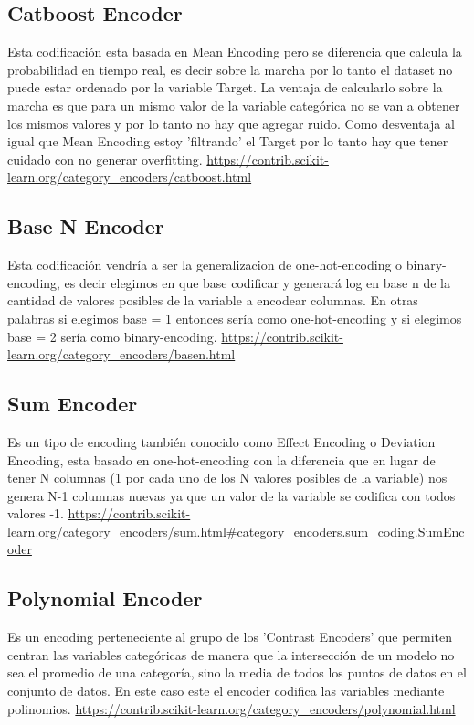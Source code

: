 \documentclass[12pt,a4paper]{article}
\begin{document}
\subsection{Catboost Encoder}
Esta codificación esta basada en Mean Encoding pero se diferencia que calcula la probabilidad en tiempo real, es decir sobre la marcha por lo tanto el dataset no puede estar ordenado por la variable Target. La ventaja de calcularlo sobre la marcha es que para un mismo valor de la variable categórica no se van a obtener los mismos valores y por lo tanto no hay que agregar ruido. Como desventaja al igual que Mean Encoding estoy 'filtrando' el Target por lo tanto hay que tener cuidado con no generar overfitting.
\url{https://contrib.scikit-learn.org/category_encoders/catboost.html}

\subsection{Base N Encoder}
Esta codificación vendría a ser la generalizacion de one-hot-encoding o binary-encoding, es decir elegimos en que base codificar y generará log en base n de la cantidad de valores posibles de la variable a encodear columnas. En otras palabras si elegimos base = 1 entonces sería como one-hot-encoding y si elegimos base = 2 sería como binary-encoding.
\url{https://contrib.scikit-learn.org/category_encoders/basen.html}

\subsection{Sum Encoder}
Es un tipo de encoding también conocido como Effect Encoding o Deviation Encoding, esta basado en one-hot-encoding con la diferencia que en lugar de tener N columnas (1 por cada uno de los N valores posibles de la variable) nos genera N-1 columnas nuevas ya que un valor de la variable se codifica con todos valores -1.
\url{https://contrib.scikit-learn.org/category_encoders/sum.html#category_encoders.sum_coding.SumEncoder}

\subsection{Polynomial Encoder}
Es un encoding perteneciente al grupo de los 'Contrast Encoders' que permiten centran las variables categóricas de manera que la intersección de un modelo no sea el promedio de una categoría, sino la media de todos los puntos de datos en el conjunto de datos.
En este caso este el encoder codifica las variables mediante polinomios. 
\url{https://contrib.scikit-learn.org/category_encoders/polynomial.html}
\end{document}
